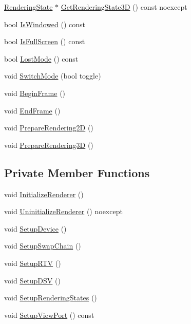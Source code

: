 \begin{DoxyCompactItemize}
\item 
\hyperlink{structmage_1_1_rendering_state}{Rendering\+State} $\ast$ \hyperlink{classmage_1_1_renderer_afde0b947dfcfea3515f6ddbfc25b8253}{Get\+Rendering\+State3D} () const noexcept
\item 
bool \hyperlink{classmage_1_1_renderer_a1de1804c1eedae7dc12435a520a10b9c}{Is\+Windowed} () const
\item 
bool \hyperlink{classmage_1_1_renderer_a5ae3220e19c68f47a8e4d55e3ced4694}{Is\+Full\+Screen} () const
\item 
bool \hyperlink{classmage_1_1_renderer_afdde83a1e2bc9288f000fb2575c525d0}{Lost\+Mode} () const
\item 
void \hyperlink{classmage_1_1_renderer_a9004ab608659188900c808eacb5f873c}{Switch\+Mode} (bool toggle)
\item 
void \hyperlink{classmage_1_1_renderer_ac9adf3be8c7201e4df8c5f9e049dc43d}{Begin\+Frame} ()
\item 
void \hyperlink{classmage_1_1_renderer_a38be3325e99a447340a048db19e6cf07}{End\+Frame} ()
\item 
void \hyperlink{classmage_1_1_renderer_a716c5ef70f425269de95db07c9ecdbfa}{Prepare\+Rendering2D} ()
\item 
void \hyperlink{classmage_1_1_renderer_a9c76ba66a275c0d74f250955e7781f77}{Prepare\+Rendering3D} ()
\end{DoxyCompactItemize}
\subsection*{Private Member Functions}
\begin{DoxyCompactItemize}
\item 
void \hyperlink{classmage_1_1_renderer_a2bb7f4e41ef6db047ce3023ed4e5d0c1}{Initialize\+Renderer} ()
\item 
void \hyperlink{classmage_1_1_renderer_a28c76b49e51e49e58fdeb0b72b12f3b6}{Uninitialize\+Renderer} () noexcept
\item 
void \hyperlink{classmage_1_1_renderer_aedf5e2e3f73d3d05c09c5fc9f8ac06c3}{Setup\+Device} ()
\item 
void \hyperlink{classmage_1_1_renderer_a8d3030611390f69120f1e5b91225eddf}{Setup\+Swap\+Chain} ()
\item 
void \hyperlink{classmage_1_1_renderer_a80f3191e8c8932f8828bca4e5086c0c0}{Setup\+R\+TV} ()
\item 
void \hyperlink{classmage_1_1_renderer_a49dc4b2353ee4e851c575f30ec1dcf22}{Setup\+D\+SV} ()
\item 
void \hyperlink{classmage_1_1_renderer_ae69efac8c058f25f1c5d409c4ec7ff6e}{Setup\+Rendering\+States} ()
\item 
void \hyperlink{classmage_1_1_renderer_ab60757e174f0f82089361a0d46a1eacc}{Setup\+View\+Port} () const
\end{DoxyCompactItemize}
